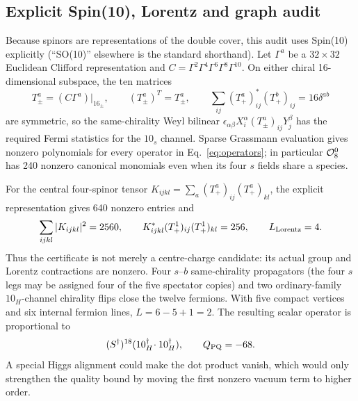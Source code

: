 \documentclass[11pt,a4paper]{article}
\begin{document}
\subsection*{Explicit Spin(10), Lorentz and graph audit}
Because spinors are representations of the double cover, this audit uses
Spin(10) explicitly (``SO(10)'' elsewhere is the standard shorthand).
Let $\Gamma^a$ be a $32\times32$ Euclidean Clifford representation and
$C=\Gamma^2\Gamma^4\Gamma^6\Gamma^8\Gamma^{10}$. On either chiral
16-dimensional subspace, the ten matrices
\begin{equation}
 T^a_\pm=(C\Gamma^a)|_{16_\pm},\qquad
 (T^a_\pm)^T=T^a_\pm,\qquad
 \sum_{ij}(T^a_+)^*_{ij}(T^b_+)_{ij}=16\delta^{ab}
\label{eq:cliffordcertificate}
\end{equation}
are symmetric, so the same-chirality Weyl bilinear
$\epsilon_{\alpha\beta}X_i^\alpha(T^a_\pm)_{ij}Y_j^\beta$
has the required Fermi statistics for the $10_s$ channel. Sparse
Grassmann evaluation gives nonzero polynomials for every operator in
Eq.~\eqref{eq:operators}; in particular ${\cal O}_8^0$ has 240 nonzero
canonical monomials even when its four $s$ fields share a species.

For the central four-spinor tensor
$K_{ijkl}=\sum_a(T^a_+)_{ij}(T^a_+)_{kl}$, the explicit representation
gives 640 nonzero entries and
\begin{equation}
 \sum_{ijkl}|K_{ijkl}|^2=2560,
 \qquad K^*_{ijkl}(T^1_+)_{ij}(T^1_+)_{kl}=256,
 \qquad L_{\rm Lorentz}=4 .
\label{eq:graphcertificate}
\end{equation}
Thus the certificate is not merely a centre-charge candidate: its actual
group and Lorentz contractions are nonzero. Four $s$--$b$ same-chirality
propagators (the four $s$ legs may be assigned four of the five spectator
copies) and two ordinary-family $10_H$-channel chirality flips close the
twelve fermions. With five compact vertices and six internal fermion lines,
$L=6-5+1=2$. The resulting scalar operator is proportional to
\begin{equation}
 (S^\dagger)^{18}(10_H^\dagger\!\cdot10_H^\dagger),
 \qquad Q_{\rm PQ}=-68 .
\label{eq:scalarphase}
\end{equation}
A special Higgs alignment could make the dot product vanish, which would
only strengthen the quality bound by moving the first nonzero vacuum term
to higher order.
\end{document}
